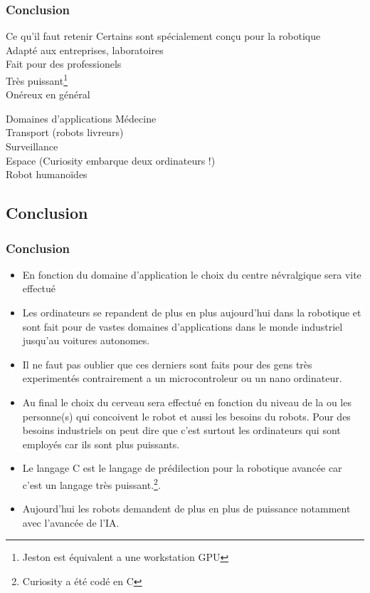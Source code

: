 \documentclass{beamer}
\begin{document}
\begin{frame}
\frametitle{Conclusion}
\begin{alertblock}{Ce qu'il faut retenir}
Certains sont spécialement conçu pour la robotique\\
Adapté aux entreprises, laboratoires\\
Fait pour des professionels\\
Très puissant\footnote{Jeston est équivalent a une workstation GPU}\\
Onéreux en général
\end{alertblock}
\begin{exampleblock}{Domaines d'applications}
Médecine\\
Transport (robots livreurs)\\
Surveillance\\
Espace (Curiosity embarque deux ordinateurs !)\\
Robot humanoïdes
\end{exampleblock}
\end{frame}
\subsection{Conclusion}
\begin{frame}
\frametitle{Conclusion}
\begin{itemize}
\item En fonction du domaine d'application le choix du centre névralgique sera vite effectué
\item Les ordinateurs se repandent de plus en plus aujourd'hui dans la robotique et sont fait pour de vastes domaines d'applications dans le monde industriel jusqu'au voitures autonomes.
\item Il ne faut pas oublier que ces derniers sont faits pour des gens très experimentés contrairement a un microcontroleur ou un nano ordinateur.
\end{itemize}
\end{frame}
\begin{frame}
\begin{itemize}
\item Au final le choix du cerveau sera effectué en fonction du niveau de la ou les personne(s) qui concoivent le robot et aussi les besoins du robots. Pour des besoins industriels on peut dire que c'est surtout les ordinateurs qui sont employés car ils sont plus puissants.
\item Le langage C est le langage de prédilection pour la robotique avancée car c'est un langage très puissant.\footnote{Curiosity a été codé en C}.
\item Aujourd'hui les robots demandent de plus en plus de puissance notamment avec l'avancée de l'IA.
\end{itemize}
\end{frame}
\end{document}

